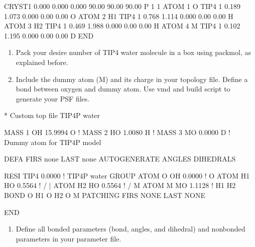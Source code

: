 \documentclass[letterpaper,10pt,english]{sphinxmanual}
\begin{document}
\begin{sphinxVerbatim}[commandchars=\\\{\}]
CRYST1    0.000    0.000    0.000  90.00  90.00  90.00 P 1           1
ATOM      1  O   TIP4    1      \PYGZhy{}0.189   1.073   0.000  0.00  0.00           O
ATOM      2  H1  TIP4    1       0.768   1.114   0.000  0.00  0.00           H
ATOM      3  H2  TIP4    1      \PYGZhy{}0.469   1.988   0.000  0.00  0.00           H
ATOM      4  M   TIP4    1      \PYGZhy{}0.102   1.195   0.000  0.00  0.00           D
END
\end{sphinxVerbatim}
\begin{enumerate}
%
\setcounter{enumi}{1}
\item {} 
\sphinxAtStartPar
Pack your desire number of TIP4 water molecule in a box using packmol, as explained before.

\item {} 
\sphinxAtStartPar
Include the dummy atom (M) and its charge in your topology file. Define a bond between oxygen and dummy atom.
Use vmd and build script to generate your PSF files.

\end{enumerate}

\begin{sphinxVerbatim}[commandchars=\\\{\}]
* Custom top file \PYGZhy{}\PYGZhy{} TIP4P water

MASS   1  OH    15.9994  O !
MASS   2  HO     1.0080  H !
MASS   3  MO     0.0000  D ! Dummy atom for TIP4P model

DEFA FIRS none LAST none
AUTOGENERATE ANGLES DIHEDRALS

RESI TIP4           0.0000 ! TIP4P water
GROUP
ATOM O      OH      0.0000 !        O
ATOM H1     HO      0.5564 !     /  |  \PYGZbs{}
ATOM H2     HO      0.5564 !    /   M   \PYGZbs{}
ATOM M      MO     \PYGZhy{}1.1128 !  H1        H2
BOND   O  H1   O  H2   O  M
PATCHING FIRS NONE LAST NONE

END
\end{sphinxVerbatim}
\begin{enumerate}
%
\setcounter{enumi}{3}
\item {} 
\sphinxAtStartPar
Define all bonded parameters (bond, angles, and dihedral) and nonbonded parameters in your parameter file.

\end{enumerate}
\end{document}
